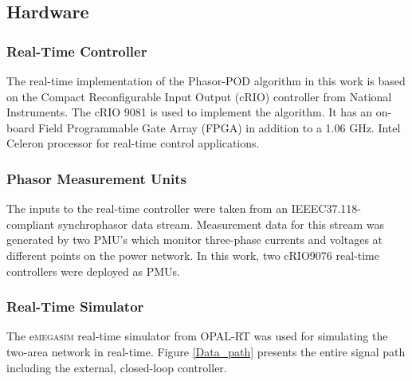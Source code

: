\documentclass[conference]{IEEEtran}
\begin{document}
\subsection{Hardware}
\subsubsection{Real-Time Controller} The real-time implementation of the Phasor-POD algorithm in this work is based on the Compact Reconfigurable Input Output (cRIO) controller from National Instruments. The cRIO 9081 is used to implement the algorithm. It has an on-board Field Programmable Gate Array (FPGA) in addition to a 1.06 GHz. Intel Celeron processor for real-time control applications\cite{cRIO9081}.

\subsubsection{Phasor Measurement Units}
The inputs to the real-time controller were taken from an IEEEC37.118-compliant synchrophasor data stream. Measurement data for this stream was generated by two PMU's which monitor three-phase currents and voltages at different points on the power network. In this work, two cRIO9076 real-time controllers \cite{cRIO9081} were deployed as PMUs\cite{PMUMario}.

\subsubsection{Real-Time Simulator}
The e\textsc{megasim} real-time simulator from OPAL-RT \cite{OPALemegasim} was used for simulating the two-area network in real-time. Figure \ref{Data_path} presents the entire signal path including the external, closed-loop controller.

\end{document}
